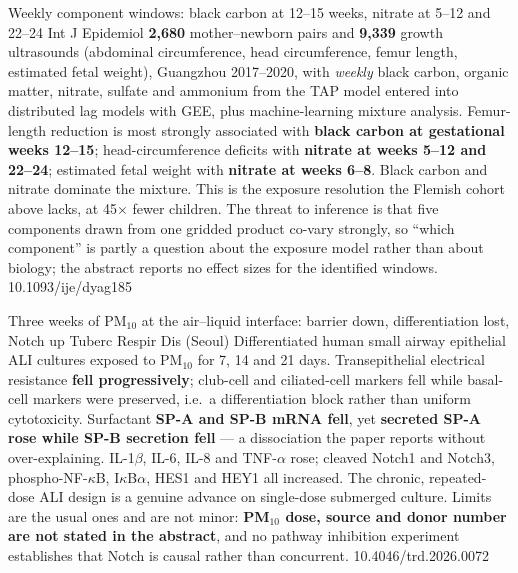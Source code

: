 \documentclass[10pt]{article}
\begin{document}
{Weekly component windows: black carbon at 12--15 weeks, nitrate at 5--12 and 22--24}
{Int J Epidemiol}
{\textbf{2{,}680} mother--newborn pairs and \textbf{9{,}339} growth ultrasounds (abdominal
circumference, head circumference, femur length, estimated fetal weight), Guangzhou
2017--2020, with \emph{weekly} black carbon, organic matter, nitrate, sulfate and ammonium
from the TAP model entered into distributed lag models with GEE, plus machine-learning
mixture analysis. Femur-length reduction is most strongly associated with \textbf{black
carbon at gestational weeks 12--15}; head-circumference deficits with \textbf{nitrate at
weeks 5--12 and 22--24}; estimated fetal weight with \textbf{nitrate at weeks 6--8}. Black
carbon and nitrate dominate the mixture. This is the exposure resolution the Flemish cohort
above lacks, at 45$\times$ fewer children. The threat to inference is that five components
drawn from one gridded product co-vary strongly, so ``which component'' is partly a
question about the exposure model rather than about biology; the abstract reports no effect
sizes for the identified windows.}
{10.1093/ije/dyag185}


{Three weeks of PM$_{10}$ at the air--liquid interface: barrier down, differentiation lost,
Notch up}
{Tuberc Respir Dis (Seoul)}
{Differentiated human small airway epithelial ALI cultures exposed to PM$_{10}$ for 7, 14
and 21 days. Transepithelial electrical resistance \textbf{fell progressively}; club-cell
and ciliated-cell markers fell while basal-cell markers were preserved, i.e.\ a
differentiation block rather than uniform cytotoxicity. Surfactant \textbf{SP-A and SP-B
mRNA fell}, yet \textbf{secreted SP-A rose while SP-B secretion fell} --- a dissociation
the paper reports without over-explaining. IL-1$\beta$, IL-6, IL-8 and TNF-$\alpha$ rose;
cleaved Notch1 and Notch3, phospho-NF-$\kappa$B, I$\kappa$B$\alpha$, HES1 and HEY1 all
increased. The chronic, repeated-dose ALI design is a genuine advance on single-dose
submerged culture. Limits are the usual ones and are not minor: \textbf{PM$_{10}$ dose,
source and donor number are not stated in the abstract}, and no pathway inhibition
experiment establishes that Notch is causal rather than concurrent.}
{10.4046/trd.2026.0072}
\end{document}
